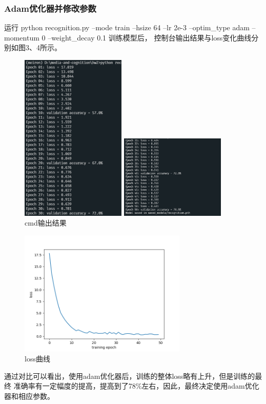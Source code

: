 \documentclass[a4paper]{article}
\begin{document}
\subsubsection{Adam优化器并修改参数}
运行 
python recognition.py --mode train --hsize 64 --lr 2e-3 --optim\_type adam --momentum 0 --weight\_decay 0.1
训练模型后，
控制台输出结果与loss变化曲线分别如图3、4所示。\par
\begin{figure}[hp]
    \centering
    \begin{minipage}[t]{0.48\textwidth}
        \centering
        \includegraphics[width=5cm]{image/adam_cmd1.png}
        \end{minipage}
        \begin{minipage}[t]{0.48\textwidth}
        \centering
        \includegraphics[width=5cm]{image/adam_cmd2.png}
    \end{minipage}
    \caption{cmd输出结果}
    \vspace{-1cm}
\end{figure}

\begin{figure}[htbp]
    \centering
    \includegraphics[width=8cm]{image/adam_figure.png}
    \caption{loss曲线}
\end{figure}
通过对比可以看出，使用adam优化器后，训练的整体loss略有上升，但是训练的最终
准确率有一定幅度的提高，提高到了78\%左右，因此，最终决定使用adam优化器和相应参数。
\end{document}
